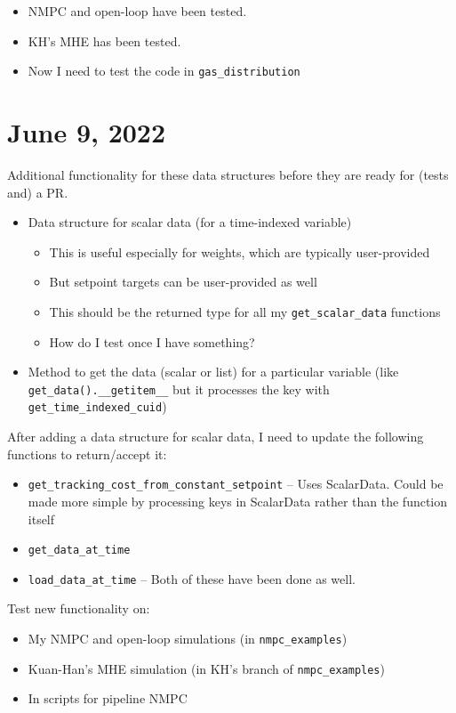 \documentclass{article}
\begin{document}
\begin{itemize}
  \item NMPC and open-loop have been tested.
  \item KH's MHE has been tested.
  \item Now I need to test the code in \texttt{gas\_distribution}
\end{itemize}

\section{June 9, 2022}
Additional functionality for these data structures before they are
ready for (tests and) a PR.
\begin{itemize}
  \item Data structure for scalar data (for a time-indexed variable)
    \begin{itemize}
      \item This is useful especially for weights, which are typically
	user-provided
      \item But setpoint targets can be user-provided as well
      \item This should be the returned type for all my
	\texttt{get\_scalar\_data} functions
      \item How do I test once I have something?
    \end{itemize}
  \item Method to get the data (scalar or list) for a particular
    variable (like \texttt{get\_data().\_\_getitem\_\_} but it processes
    the key with \texttt{get\_time\_indexed\_cuid})
\end{itemize}

After adding a data structure for scalar data, I need to update
the following functions to return/accept it:
\begin{itemize}
  \item \texttt{get\_tracking\_cost\_from\_constant\_setpoint}
    -- Uses ScalarData. Could be made more simple by processing keys
    in ScalarData rather than the function itself
  \item \texttt{get\_data\_at\_time}
  \item \texttt{load\_data\_at\_time}
    -- Both of these have been done as well.
\end{itemize}

Test new functionality on:
\begin{itemize}
  \item My NMPC and open-loop simulations (in \texttt{nmpc\_examples})
  \item Kuan-Han's MHE simulation (in KH's branch of \texttt{nmpc\_examples})
  \item In scripts for pipeline NMPC
\end{itemize}
\end{document}
